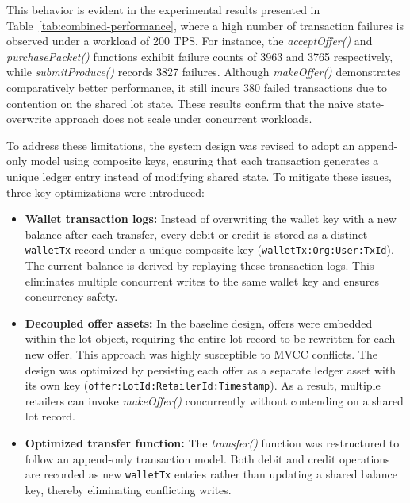 \documentclass[12pt]{article}
\begin{document}
	This behavior is evident in the experimental results presented in 
	Table~\ref{tab:combined-performance}, where a high number of transaction 
	failures is observed under a workload of 200 TPS. For instance, the 
	\textit{acceptOffer()} and \textit{purchasePacket()} functions exhibit failure 
	counts of 3963 and 3765 respectively, while \textit{submitProduce()} records 
	3827 failures. Although \textit{makeOffer()} demonstrates comparatively better 
	performance, it still incurs 380 failed transactions due to contention on the 
	shared lot state. These results confirm that the naive state-overwrite approach 
	does not scale under concurrent workloads.
	
	To address these limitations, the system design was revised to adopt an append-only 
	model using composite keys, ensuring that each transaction generates a unique ledger 
	entry instead of modifying shared state. To mitigate these issues, three key 
	optimizations were introduced:
	
	\begin{itemize}
		\item \textbf{Wallet transaction logs:} Instead of overwriting the wallet 
		key with a new balance after each transfer, every debit or credit is stored as a 
		distinct \texttt{walletTx} record under a unique composite key 
		(\texttt{walletTx:Org:User:TxId}). The current balance is derived by replaying 
		these transaction logs. This eliminates multiple concurrent writes to the same 
		wallet key and ensures concurrency safety.
		
		\item \textbf{Decoupled offer assets:} In the baseline design, offers were 
		embedded within the lot object, requiring the entire lot record to be rewritten 
		for each new offer. This approach was highly susceptible to MVCC conflicts. 
		The design was optimized by persisting each offer as a separate ledger asset 
		with its own key (\texttt{offer:LotId:RetailerId:Timestamp}). As a result, 
		multiple retailers can invoke \textit{makeOffer()} concurrently without 
		contending on a shared lot record.
		
		\item \textbf{Optimized transfer function:} The \textit{transfer()} function 
		was restructured to follow an append-only transaction model. Both debit and 
		credit operations are recorded as new \texttt{walletTx} entries rather than 
		updating a shared balance key, thereby eliminating conflicting writes.
	\end{itemize}
	
\end{document}
